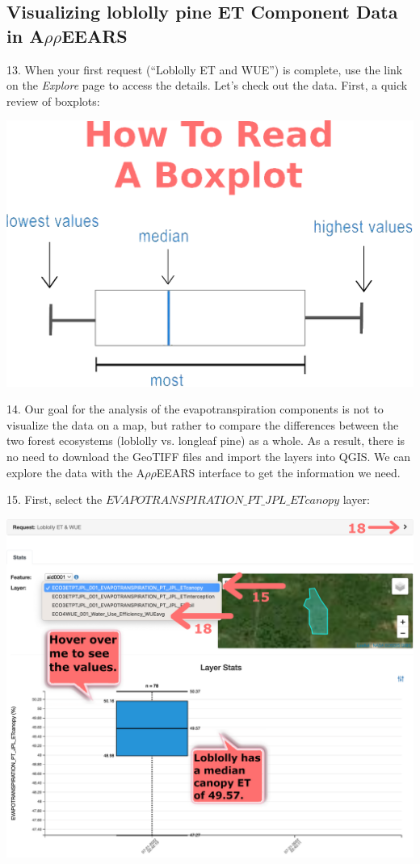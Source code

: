 \documentclass[oneside,a4paper,11pt,explicit]{book}
\begin{document}
\subsection{Visualizing loblolly pine ET Component Data in A$\rho\rho$EEARS}

13. When your first request (``Loblolly ET and WUE'') is complete, use the link on the \textit{Explore} page to access the details. Let's check out the data. First, a quick review of boxplots:

\vspace{1em}

\centerline{\includegraphics[width=.45\textwidth]{HowToBoxplot.png}}

\vspace{.5em}

14. Our goal for the analysis of the evapotranspiration components is not to visualize the data on a map, but rather to compare the differences between the two forest ecosystems (loblolly vs. longleaf pine) as a whole. As a result, there is no need to download the GeoTIFF files and import the layers into QGIS. We can explore the data with the A$\rho\rho$EEARS interface to get the information we need.

15. First, select the $EVAPOTRANSPIRATION\_PT\_JPL\_ETcanopy$ layer:

\vspace{.5em}

\centerline{\includegraphics[width=.6\textwidth]{ETComponents.png}}
\end{document}
